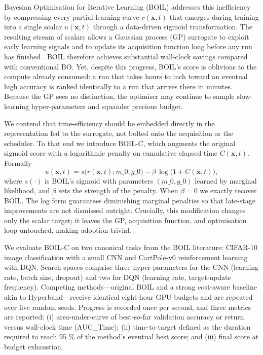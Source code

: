 \documentclass{article} %
\begin{document}
Bayesian Optimisation for Iterative Learning (BOIL) addresses this inefficiency by compressing every partial learning curve \(r(\mathbf{x}, t)\) that emerges during training into a single scalar \(u(\mathbf{x}, t)\) through a data-driven sigmoid transformation. The resulting stream of scalars allows a Gaussian process (GP) surrogate to exploit early learning signals and to update its acquisition function long before any run has finished \cite{nguyen-2019-bayesian}. BOIL therefore achieves substantial wall-clock savings compared with conventional BO. Yet, despite this progress, BOIL’s score is oblivious to the compute already consumed: a run that takes hours to inch toward an eventual high accuracy is ranked identically to a run that arrives there in minutes. Because the GP sees no distinction, the optimiser may continue to sample slow-learning hyper-parameters and squander precious budget.

We contend that time-efficiency should be embedded directly in the representation fed to the surrogate, not bolted onto the acquisition or the scheduler. To that end we introduce BOIL-C, which augments the original sigmoid score with a logarithmic penalty on cumulative elapsed time \(C(\mathbf{x}, t)\). Formally
\[
  u(\mathbf{x}, t) = s\big(r(\mathbf{x}, t); m\_0, g\_0\big) - \beta\, \log\!\big(1 + C(\mathbf{x}, t)\big),
\]
where \(s(\cdot)\) is BOIL’s sigmoid with parameters \((m\_0, g\_0)\) learned by marginal likelihood, and \(\beta\) sets the strength of the penalty. When \(\beta = 0\) we exactly recover BOIL. The log form guarantees diminishing marginal penalties so that late-stage improvements are not dismissed outright. Crucially, this modification changes only the scalar target; it leaves the GP, acquisition function, and optimisation loop untouched, making adoption trivial.

We evaluate BOIL-C on two canonical tasks from the BOIL literature: CIFAR-10 image classification with a small CNN and CartPole-v0 reinforcement learning with DQN. Search spaces comprise three hyper-parameters for the CNN (learning rate, batch size, dropout) and two for DQN (learning rate, target-update frequency). Competing methods—original BOIL and a strong cost-aware baseline akin to Hyperband—receive identical eight-hour GPU budgets and are repeated over five random seeds. Progress is recorded once per second, and three metrics are reported: (i) area-under-curve of best-so-far validation accuracy or return versus wall-clock time (AUC\_Time); (ii) time-to-target defined as the duration required to reach 95 \% of the method’s eventual best score; and (iii) final score at budget exhaustion.
\end{document}

